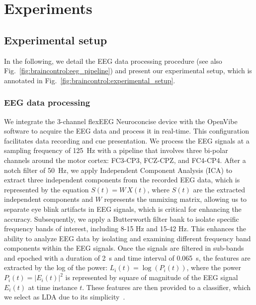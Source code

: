 \section{Experiments}

\subsection{Experimental setup}
In the following, we detail the \gls{EEG} data processing procedure (see also Fig.~\ref{fig:braincontrol:eeg_pipeline}) and present our experimental setup, which is annotated in Fig.~\ref{fig:braincontrol:experimental_setup}.

\subsubsection{EEG data processing}\label{ssub:braincontrol:eeg_pipeline}
We integrate the 3-channel flexEEG Neuroconcise device with the OpenVibe software
to acquire the EEG data and process it in real-time.
This configuration facilitates data recording and cue presentation. We process the \gls{EEG} signals at a sampling frequency of \SI{125}{Hz} with a pipeline that involves three bi-polar channels around the motor cortex: FC3-CP3, FCZ-CPZ, and FC4-CP4.
After a notch filter of \SI{50}{Hz}, we apply Independent Component Analysis (ICA) to extract three independent components from the recorded \gls{EEG} data, which is represented by the equation $S(t) = W \, X(t)$, where $S(t)$ are the extracted independent components and $W$ represents the unmixing matrix, allowing us to separate eye blink artifacts in \gls{EEG} signals, which is critical for enhancing the accuracy. 
Subsequently, we apply a Butterworth filter bank to isolate specific frequency bands of interest, including 8-15 \si{Hz} and 15-42 \si{Hz}. 
This enhances the ability to analyze \gls{EEG} data by isolating and examining different frequency band components within the \gls{EEG} signals. Once the signals are filtered in sub-bands and epoched with a duration of \SI{2}{s} and time interval of \SI{0.065}{s}, the features are extracted by the log of the power: $L_i(t) = \log\left(P_i(t)\right)$, where the power $P_i(t) = |E_i(t)|^2$ is represented by square of magnitude of the \gls{EEG} signal $E_i(t)$ at time instance $t$.
These features are then provided to a classifier, which we select as \gls{LDA} due to its simplicity~\citep{lotte2014tutorial}.

